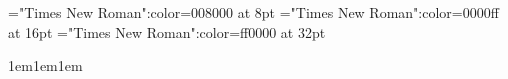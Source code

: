 \documentclass{article}
\begin{document}
 
\thispagestyle{empty} 
\font\tctbta="Times New Roman":color=008000 at 8pt
\font\tbta="Times New Roman":color=0000ff at 16pt
\font\ta="Times New Roman":color=ff0000 at 32pt

\baselineskip 1em{}\baselineskip 1em{}\baselineskip 1em{}
\end{document}
